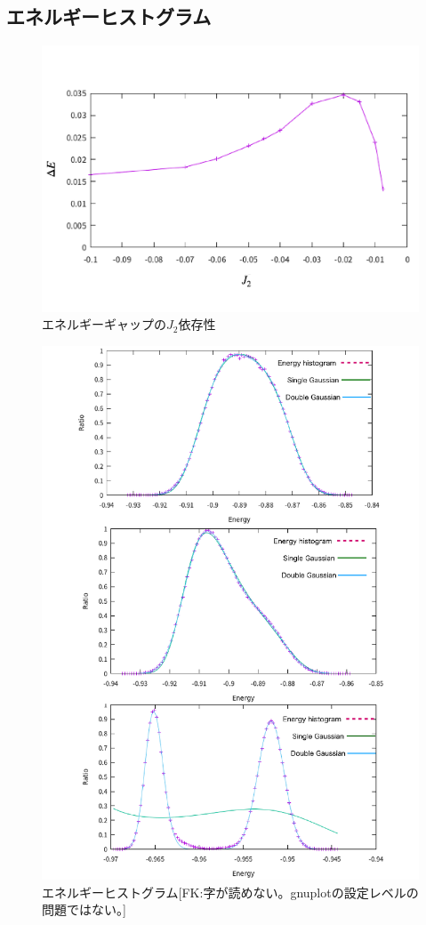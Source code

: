 \documentclass[12pt,titlepage,dvipdfmx]{jarticle}
\begin{document}
\subsection{エネルギーヒストグラム}

\begin{figure}[tbh]
   \centering
   \includegraphics[width=15cm]{figure/egap_j2.pdf}
   \caption{エネルギーギャップの$J_2$依存性}
\end{figure}

\begin{figure}[tbh]
   \centering
   \includegraphics[width=15cm]{figure/energy_histogram.pdf}
   \caption{エネルギーヒストグラム[FK:字が読めない。gnuplotの設定レベルの問題ではない。]}
\end{figure}
\end{document}

